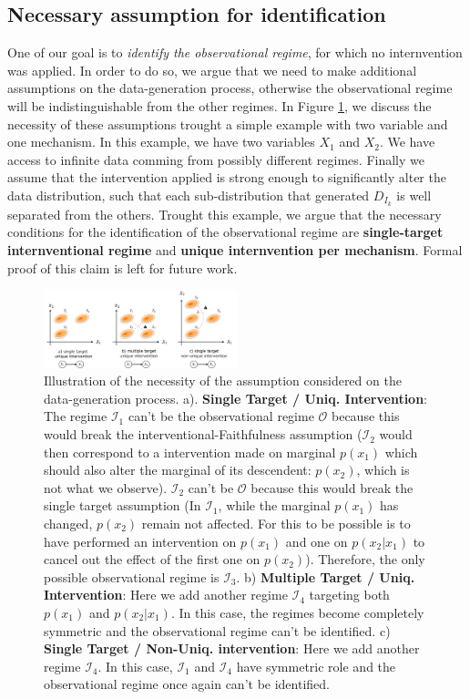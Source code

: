 \documentclass{article}
\begin{document}
\subsection{Necessary assumption for identification}\label{subsec:Relevance}

One of our goal is to \textit{identify the observational regime}, for which no
internvention was applied. In order to do so, we argue that we need to make
additional assumptions on the data-generation process, otherwise the
observational regime will be indistinguishable from the other regimes. In
Figure \ref{fig:assumption}, we discuss the necessity of these assumptions
trought a simple example with two variable and one mechanism. In this example,
we have two variables $X_1$ and $X_2$. We have access to infinite data comming
from possibly different regimes. Finally we assume that the intervention
applied is strong enough to significantly alter the data distribution, such
that each sub-distribution that generated $D_{I_k}$ is well separated from the
others. Trought this example, we argue that the necessary conditions for the
identification of the observational regime are \textbf{single-target
    internventional regime} and \textbf{unique internvention per mechanism}. Formal
proof of this claim is left for future work.

\begin{figure}
    \centering
    \includegraphics[width=0.5\textwidth]{images/assumption.pdf}
    \caption{Illustration of the necessity of the assumption considered on the data-generation process. a). \textbf{Single Target / Uniq. Intervention}: The regime $\mathcal{I}_1$ can't be the observational regime $\mathcal{O}$ because this would break the interventional-Faithfulness assumption ($\mathcal{I}_2$ would then correspond to a intervention made on marginal $p(x_1)$ which should also alter the marginal of its descendent: $p(x_2)$, which is not what we observe). $\mathcal{I}_2$ can't be $\mathcal{O}$ because this would break the single target assumption (In $\mathcal{I}_1$, while the marginal $p(x_1)$ has changed, $p(x_2)$ remain not affected. For this to be possible is to have performed an intervention on $p(x_1)$ and one on $p(x_2|x_1)$ to cancel out the effect of the first one on $p(x_2)$). Therefore, the only possible observational regime is $\mathcal{I}_3$. b) \textbf{Multiple Target / Uniq. Intervention}: Here we add another regime $\mathcal{I}_4$ targeting both $p(x_1)$ and $p(x_2|x_1)$. In this case, the regimes become completely symmetric and the observational regime can't be identified. c) \textbf{Single Target / Non-Uniq. intervention}: Here we add another regime $\mathcal{I}_4$. In this case, $\mathcal I_1$ and $\mathcal{I}_4$ have symmetric role and the observational regime once again can't be identified.}
    \label{fig:assumption}
\end{figure}
\end{document}
